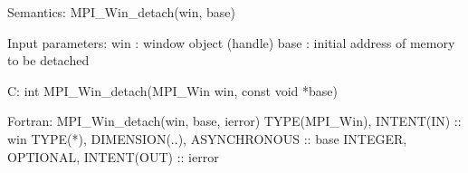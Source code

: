 Semantics:
MPI_Win_detach(win, base)

Input parameters:
win : window object (handle)
base : initial address of memory to be detached

C:
int MPI_Win_detach(MPI_Win win, const void *base)

Fortran:
MPI_Win_detach(win, base, ierror)
TYPE(MPI_Win), INTENT(IN) :: win
TYPE(*), DIMENSION(..), ASYNCHRONOUS :: base
INTEGER, OPTIONAL, INTENT(OUT) :: ierror
